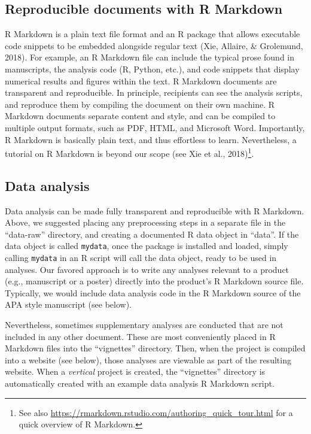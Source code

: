 \documentclass[
  english,
  jou,floatsintext]{apa6}
\begin{document}
\hypertarget{reproducible-documents-with-r-markdown}{%
\subsection{Reproducible documents with R Markdown}\label{reproducible-documents-with-r-markdown}}

R Markdown is a plain text file format and an R package that allows executable code snippets to be embedded alongside regular text (Xie, Allaire, \& Grolemund, 2018). For example, an R Markdown file can include the typical prose found in manuscripts, the analysis code (R, Python, etc.), and code snippets that display numerical results and figures within the text. R Markdown documents are transparent and reproducible. In principle, recipients can see the analysis scripts, and reproduce them by compiling the document on their own machine. R Markdown documents separate content and style, and can be compiled to multiple output formats, such as PDF, HTML, and Microsoft Word. Importantly, R Markdown is basically plain text, and thus effortless to learn. Nevertheless, a tutorial on R Markdown is beyond our scope (see Xie et al., 2018)\footnote{See also \url{https://rmarkdown.rstudio.com/authoring_quick_tour.html} for a quick overview of R Markdown.}.

\hypertarget{data-analysis}{%
\subsection{Data analysis}\label{data-analysis}}

Data analysis can be made fully transparent and reproducible with R Markdown. Above, we suggested placing any preprocessing steps in a separate file in the ``data-raw'' directory, and creating a documented R data object in ``data''. If the data object is called \texttt{mydata}, once the package is installed and loaded, simply calling \texttt{mydata} in an R script will call the data object, ready to be used in analyses. Our favored approach is to write any analyses relevant to a product (e.g., manuscript or a poster) directly into the product's R Markdown source file. Typically, we would include data analysis code in the R Markdown source of the APA style manuscript (see below).

Nevertheless, sometimes supplementary analyses are conducted that are not included in any other document. These are most conveniently placed in R Markdown files into the ``vignettes'' directory. Then, when the project is compiled into a website (see below), those analyses are viewable as part of the resulting website. When a \emph{vertical} project is created, the ``vignettes'' directory is automatically created with an example data analysis R Markdown script.
\end{document}
